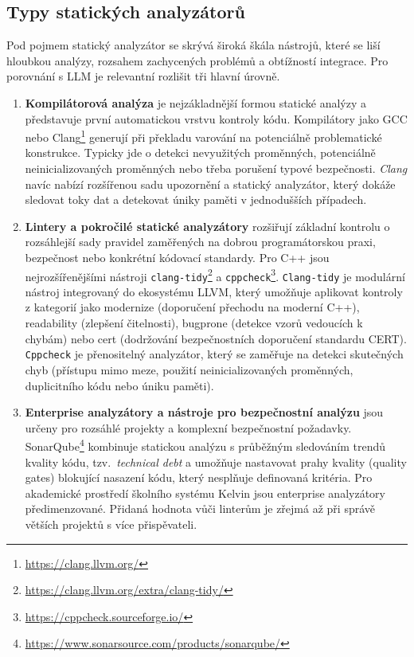 \subsection{Typy statických analyzátorů}
\label{subsec:static-types}

Pod pojmem statický analyzátor se skrývá široká škála nástrojů, které se liší hloubkou analýzy, rozsahem zachycených problémů a obtížností integrace.
Pro porovnání s LLM je relevantní rozlišit tři hlavní úrovně.

\begin{enumerate}
    \item \textbf{Kompilátorová analýza} je nejzákladnější formou statické analýzy a představuje první automatickou vrstvu kontroly kódu.
    Kompilátory jako GCC nebo Clang\footnote{\url{https://clang.llvm.org/}} generují při překladu varování na potenciálně problematické konstrukce.
    Typicky jde o detekci nevyužitých proměnných, potenciálně neinicializovaných proměnných nebo třeba porušení typové bezpečnosti.
    \textit{Clang} navíc nabízí rozšířenou sadu upozornění a statický analyzátor, který dokáže sledovat toky dat a detekovat úniky paměti v jednodušších případech.

    \item \textbf{Lintery a pokročilé statické analyzátory} rozšiřují základní kontrolu o rozsáhlejší sady pravidel zaměřených na dobrou programátorskou praxi, bezpečnost nebo konkrétní kódovací standardy.
    Pro C++ jsou nejrozšířenějšími nástroji \texttt{clang-tidy}\footnote{\url{https://clang.llvm.org/extra/clang-tidy/}} a \texttt{cppcheck}\footnote{\url{https://cppcheck.sourceforge.io/}}.
    \texttt{Clang-tidy} je modulární nástroj integrovaný do ekosystému LLVM, který umožňuje aplikovat kontroly z kategorií jako modernize (doporučení přechodu na moderní C++), readability (zlepšení čitelnosti), bugprone (detekce vzorů vedoucích k chybám) nebo cert (dodržování bezpečnostních doporučení standardu CERT).
    \texttt{Cppcheck} je přenositelný analyzátor, který se zaměřuje na detekci skutečných chyb (přístupu mimo meze, použití neinicializovaných proměnných, duplicitního kódu nebo úniku paměti).

    \item \textbf{Enterprise analyzátory a nástroje pro bezpečnostní analýzu} jsou určeny pro rozsáhlé projekty a komplexní bezpečnostní požadavky.
    SonarQube\footnote{\url{https://www.sonarsource.com/products/sonarqube/}} kombinuje statickou analýzu s průběžným sledováním trendů kvality kódu, tzv.~\textit{technical debt} a umožňuje nastavovat prahy kvality (quality gates) blokující nasazení kódu, který nesplňuje definovaná kritéria.
    Pro akademické prostředí školního systému Kelvin jsou enterprise analyzátory předimenzované.
    Přidaná hodnota vůči linterům je zřejmá až při správě větších projektů s více přispěvateli.
\end{enumerate}

\endinput